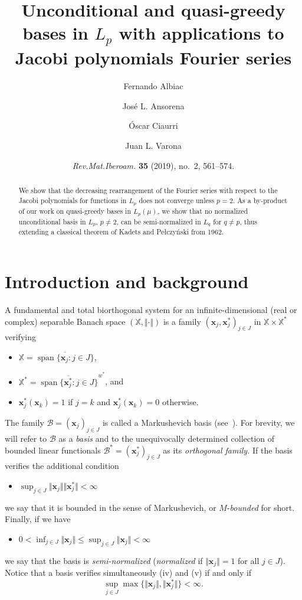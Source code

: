 \documentclass[11pt, leqno]{amsart}
\title[Quasi-greedy bases  and Jacobi polynomials in $L_p$ spaces]{Unconditional and quasi-greedy bases in $L_p$ with applications to Jacobi polynomials Fourier series}
\author[F. Albiac]{Fernando Albiac}
\author[J. L. Ansorena]{Jos\'e L. Ansorena}
\author[\'O. Ciaurri]{\'Oscar Ciaurri}
\author[J. L. Varona]{Juan L. Varona}
\date{\textit{Rev.\@ Mat.\@ Iberoam.\@} \textbf{35} (2019), no.~2, 561--574.}
\theoremstyle{remark}
\numberwithin{equation}{section}
\newcommand{\XX}{\ensuremath{\mathbb{X}}}
\newcommand{\xx}{\ensuremath{\mathbf{x}}}
\newcommand{\BB}{\mathcal{B}}
\newcommand{\spn}{\operatorname{span}}
\begin{document}

\begin{abstract} 
We  show that  the decreasing rearrangement of the Fourier series with respect to  the Jacobi polynomials for functions in $L_p$  does not converge unless $p=2$. As a by-product of our work on quasi-greedy bases in $L_{p}(\mu)$, we show that no normalized unconditional basis in $L_p$, $p\not=2$, can be semi-normalized in $L_q$ for $q\not=p$, thus extending a classical theorem of Kadets and Pe{\l}czy{\'n}ski from 1962.
\end{abstract}

\maketitle

\section{Introduction and background}
\label{Introduction}

A fundamental and total biorthogonal system for an infinite-dimensional  (real or complex) separable Banach space
$(\XX, \Vert\cdot\Vert)$
is a family $(\xx_{j},\xx_{j}^{\ast})_{j\in J}$ in  $\XX\times \XX^{\ast}$ verifying
\begin{itemize}
\item[(i)] $\XX= \overline{\spn \{ \xx_{j} : j\in J\}}$,
\item[(ii)] $\XX^*= \overline{\spn \{ \xx^*_{j} : j\in J\}}^{w^*}$,
 and
\item[(iii)] $\xx_{j}^{\ast}(\xx_{k})=1$ if $j=k$ and $\xx_{j}^{\ast}(\xx_{k})=0$ otherwise.
\end{itemize}
The family $\BB=(\xx_j)_{j\in J}$ is called a Markushevich basis (see~\cite{HMVZ2008}).
For brevity, we will refer to $\BB$ as a \textit{basis} and to the unequivocally determined collection of bounded linear functionals $\BB^*=(\xx_j^*)_{j\in J}$ as its
\textit{orthogonal family.}
If the basis verifies the additional condition
\begin{itemize}
\item[(iv)] $\sup_{j\in J} \Vert \xx_j\Vert \Vert \xx^*_j\Vert <\infty$
\end{itemize}
we say that  it is bounded in the sense of Markushevich, or $M$-\textit{bounded} for short. Finally, if we have
\begin{itemize}
\item[(v)] $0<\inf_{j\in J} \Vert \xx_j\Vert \le \sup_{j\in J} \Vert \xx_j\Vert <\infty$
\end{itemize}
we say that the basis 
is \textit{semi-normalized} (\textit{normalized} if $\Vert \xx_j\Vert=1$ for all $j\in J$). 
Notice that a basis verifies simultaneously (iv) and (v) if and only if
\[
\sup_{j \in J} \max\{ \Vert \xx_j\Vert ,\Vert \xx_j^*\Vert \}<\infty.
\]
\end{document}
